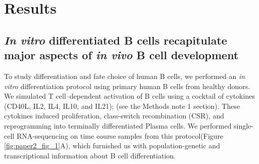 \section{Results}

\subsection{\textit{In vitro} differentiated B cells recapitulate major aspects of \textit{in vivo} B cell development}

To study differentiation and fate choice of human B cells, we performed an \textit{in vitro} differentiation protocol using primary human B cells from healthy donors. We simulated T cell–dependent activation of B cells using a cocktail of cytokines (CD40L, IL2, IL4, IL10, and IL21); (see the Methods note 1 section). These cytokines induced proliferation, class-switch recombination (CSR), and reprogramming into terminally differentiated Plasma cells. We performed single-cell RNA-sequencing on time course samples from this protocol(Figure \ref{fig:paper2_fig_1}A), which furnished us with population-genetic and transcriptional information about B cell differentiation. 
